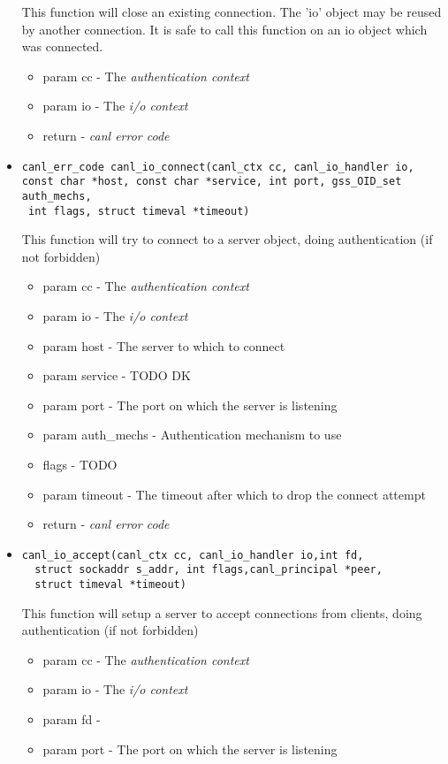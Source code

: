 \begin{itemize}
  This function will close an existing connection.  The 'io' object may 
  be reused by another connection. It is safe to call this 
  function on an io object which was connected.
  \begin{itemize}
    \item param cc - The \textit{authentication context}
    \item param io - The \textit{i/o context}
    \item return - \textit{canl error code}
  \end{itemize}
  \item \begin{verbatim}canl_err_code canl_io_connect(canl_ctx cc, canl_io_handler io, 
const char *host, const char *service, int port, gss_OID_set auth_mechs,
 int flags, struct timeval *timeout)\end{verbatim}
  This function will try to connect to a server object, 
  doing authentication (if not forbidden)
  \begin{itemize}
    \item param cc - The \textit{authentication context}
    \item param io - The \textit{i/o context}
    \item param host - The server to which to connect
    \item param service - TODO DK
    \item param port - The port on which the server is listening
    \item param auth\_mechs - Authentication mechanism to use
    \item flags - TODO
    \item param timeout - The timeout after which to drop the connect attempt
    \item return - \textit{canl error code}
  \end{itemize}
  \item \begin{verbatim}canl_io_accept(canl_ctx cc, canl_io_handler io,int fd,
  struct sockaddr s_addr, int flags,canl_principal *peer,
  struct timeval *timeout)\end{verbatim}
  This function will 
  setup a server to accept connections from clients, doing 
  authentication (if not forbidden)
  \begin{itemize}
    \item param cc - The \textit{authentication context}
    \item param io - The \textit{i/o context}
    \item param fd - \TODO
    \item param port - The port on which the server is listening
  \end{itemize}

\end{itemize}


